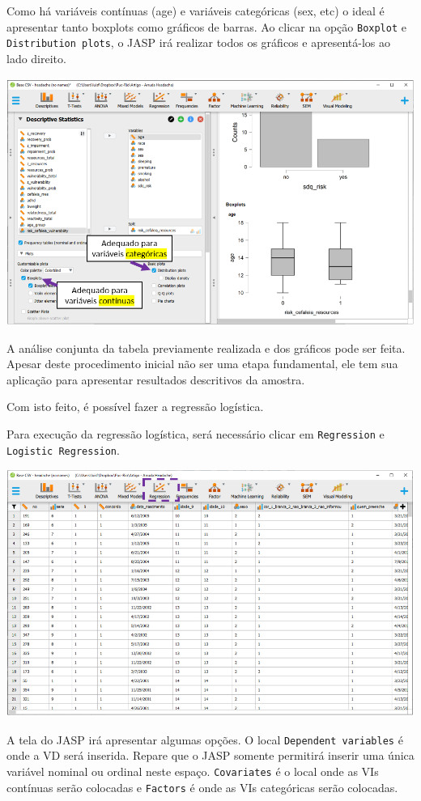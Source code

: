 \documentclass[
]{book}
\begin{document}
Como há variáveis contínuas (age) e variáveis categóricas (sex, etc) o ideal é apresentar tanto boxplots como gráficos de barras. Ao clicar na opção \texttt{Boxplot} e \texttt{Distribution\ plots}, o JASP irá realizar todos os gráficos e apresentá-los ao lado direito.

\includegraphics{./img/cap_logistica_plots2.png}

A análise conjunta da tabela previamente realizada e dos gráficos pode ser feita. Apesar deste procedimento inicial não ser uma etapa fundamental, ele tem sua aplicação para apresentar resultados descritivos da amostra.

Com isto feito, é possível fazer a regressão logística.

Para execução da regressão logística, será necessário clicar em \texttt{Regression} e \texttt{Logistic\ Regression}.

\includegraphics{./img/cap_logistica_regression.png}

A tela do JASP irá apresentar algumas opções. O local \texttt{Dependent\ variables} é onde a VD será inserida. Repare que o JASP somente permitirá inserir uma única variável nominal ou ordinal neste espaço. \texttt{Covariates} é o local onde as VIs contínuas serão colocadas e \texttt{Factors} é onde as VIs categóricas serão colocadas.
\end{document}
